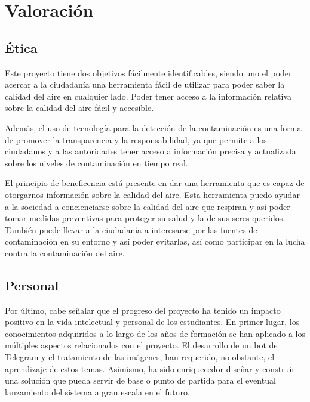 \chapter{Valoración}\label{val}
\thispagestyle{fancy}
\section{Ética}
Este proyecto tiene dos objetivos fácilmente identificables, siendo uno el poder acercar a la ciudadanía una herramienta fácil de utilizar para poder saber la calidad del aire en cualquier lado.
Poder tener acceso a la información relativa sobre la calidad del aire fácil y accesible.

Además, el uso de tecnología para la detección de la contaminación es una forma de promover la transparencia y la responsabilidad, ya que permite a los ciudadanos y a las autoridades tener acceso a información precisa y actualizada sobre los niveles de contaminación en tiempo real.

El principio de beneficencia está presente en dar una herramienta que es capaz de otorgarnos información sobre la calidad del aire. Esta herramienta puedo ayudar a la sociedad a concienciarse sobre la calidad del aire que respiran y así poder tomar medidas preventivas para proteger su salud y la de sus seres queridos.
También puede llevar a la ciudadanía a interesarse por las fuentes de contaminación en su entorno y así poder evitarlas, así como participar en la lucha contra la contaminación del aire.


\section{Personal}
Por último, cabe señalar que el progreso del proyecto ha tenido un impacto positivo en la vida intelectual y personal de los estudiantes. En primer lugar, los conocimientos adquiridos a lo largo de los años de formación se han aplicado a los múltiples aspectos relacionados con el proyecto. El desarrollo de un bot de Telegram y el tratamiento de las imágenes, han requerido, no obstante, el aprendizaje de estos temas.
Asimismo, ha sido enriquecedor diseñar y construir una solución que pueda servir de base o punto de partida para el eventual lanzamiento del sistema a gran escala en el futuro.